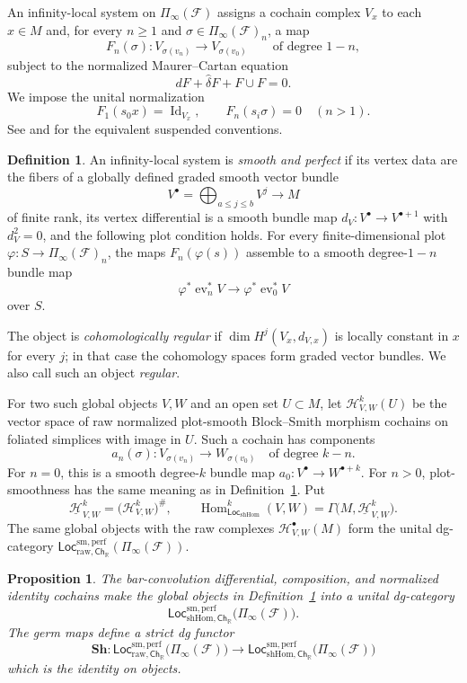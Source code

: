 \documentclass[12pt]{amsart}
\newtheorem{prop}[thm]{Proposition}
\theoremstyle{definition}
\newtheorem{defn}[thm]{Definition}
\theoremstyle{remark}
\numberwithin{equation}{section}
\newcommand{\CF}{{\mathcal F}}
\newcommand{\R}{{\mathbb{R}}}
\newcommand{\1}{{\mathbb{1}}}
\newcommand{\Ch}{\mathsf{Ch}}
\newcommand{\Loc}{\mathsf{Loc}}
\newcommand{\id}{\operatorname{Id}}
\newcommand{\ev}{\operatorname{ev}}
\begin{document}
An infinity-local system on $\Pi_{\infty}(\CF)$ assigns a cochain
complex $V_x$ to each $x\in M$ and, for every $n\geq1$ and
$\sigma\in\Pi_{\infty}(\CF)_n$, a map
\[
 F_n(\sigma):
 V_{\sigma(v_n)}\longrightarrow V_{\sigma(v_0)}
\qquad\text{of degree }1-n,
\]
subject to the normalized Maurer--Cartan equation
\[
 dF+\widehat\delta F+F\cup F=0.
\]
We impose the unital normalization
\[
 F_1(s_0x)=\id_{V_x},
 \qquad
 F_n(s_i\sigma)=0\quad(n>1).
\]
See \cite[Section 2]{BS14} and \cite[Appendix A]{AS12} for the
equivalent suspended conventions.

\begin{defn}\label{def:smooth-local-system}
An infinity-local system is \emph{smooth and perfect} if its vertex
data are the fibers of a globally defined graded smooth vector bundle
\[
 V^\bullet=\bigoplus_{a\leq j\leq b}V^j\longrightarrow M
\]
of finite rank, its vertex differential is a
smooth bundle map $d_V:V^\bullet\to V^{\bullet+1}$ with $d_V^2=0$,
and the following plot condition holds.  For every finite-dimensional
plot $\varphi:S\to\Pi_{\infty}(\CF)_n$, the maps
$F_n(\varphi(s))$ assemble to a smooth degree-$1-n$ bundle map
\[
 \varphi^*\ev_n^*V\longrightarrow\varphi^*\ev_0^*V
\]
over $S$.

The object is \emph{cohomologically regular} if
$\dim H^j(V_x,d_{V,x})$ is locally constant in $x$ for every $j$; in
that case the cohomology spaces form graded vector bundles.  We also
call such an object \emph{regular}.
\end{defn}

For two such global objects $V,W$ and an open set $U\subset M$, let
$\mathcal H^k_{V,W}(U)$ be the vector space of raw normalized
plot-smooth Block--Smith morphism cochains on foliated simplices with
image in $U$.  Such a cochain has components
\[
 a_n(\sigma):V_{\sigma(v_n)}\longrightarrow W_{\sigma(v_0)}
 \quad\text{of degree }k-n.
\]
For $n=0$, this is a smooth degree-$k$ bundle map
$a_0:V^\bullet\to W^{\bullet+k}$.  For $n>0$, plot-smoothness has the
same meaning as in Definition~\ref{def:smooth-local-system}.  Put
\[
 \underline{\mathcal H}^k_{V,W}
 =
 \bigl(\mathcal H^k_{V,W}\bigr)^\#,
 \qquad
 \operatorname{Hom}^k_{\Loc_{\mathrm{shHom}}}(V,W)
 =
 \Gamma\bigl(M,\underline{\mathcal H}^k_{V,W}\bigr).
\]
The same global objects with the raw complexes
$\mathcal H^\bullet_{V,W}(M)$ form the unital dg-category
$\Loc_{\mathrm{raw},\Ch_{\R}}^{\mathrm{sm,perf}}
(\Pi_\infty(\CF))$.

\begin{prop}\label{prop:sheafified-target}
The bar-convolution differential, composition, and normalized identity
cochains make the global objects in
Definition~\ref{def:smooth-local-system} into a unital dg-category
\[
 \Loc_{\mathrm{shHom},\Ch_{\R}}^{\mathrm{sm,perf}}
 \bigl(\Pi_{\infty}(\CF)\bigr).
\]
The germ maps define a strict dg functor
\[
 \mathbf{Sh}:
 \Loc_{\mathrm{raw},\Ch_{\R}}^{\mathrm{sm,perf}}
 \bigl(\Pi_{\infty}(\CF)\bigr)
 \longrightarrow
 \Loc_{\mathrm{shHom},\Ch_{\R}}^{\mathrm{sm,perf}}
 \bigl(\Pi_{\infty}(\CF)\bigr)
\]
which is the identity on objects.
\end{prop}
\end{document}
